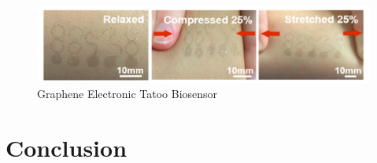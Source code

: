 \documentclass[sigconf]{acmart}
\begin{document}
\begin{figure}[!ht]
  \centering\includegraphics[width=\columnwidth]{images/Figure7.pdf}
  \caption{Graphene Electronic Tatoo Biosensor \cite{ameri17}
  }\label{f:Figure7}
\end{figure}


\section{Conclusion}
\end{document}
